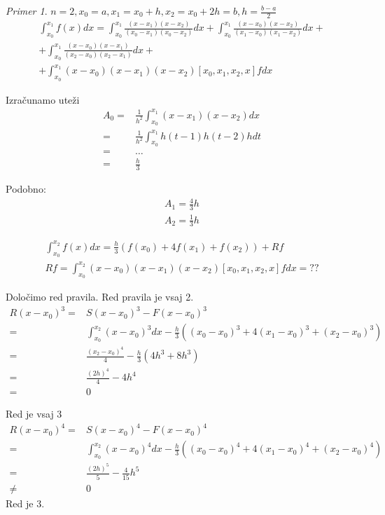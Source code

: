 \documentclass[a4paper,12pt]{article}
\theoremstyle{definition}
\theoremstyle{remark}
\newtheorem*{ex}{Primer}
\begin{document}
\begin{ex}
    $n = 2, x_0 = a, x_1 = x_0 + h, x_2 = x_0 + 2h = b, h = \frac{b-a}{2}$
    \begin{multline*}
        \int_{x_0}^{x_1} f(x) dx = \int_{x_0}^{x_1} \frac{(x-x_1)(x-x_2)}{(x_0-x_1)(x_0-x_2)} dx + \int_{x_0}^{x_1} \frac{(x-x_0)(x-x_2)}{(x_1-x_0)(x_1-x_2)} dx + \\
        + \int_{x_0}^{x_1} \frac{(x-x_0)(x-x_1)}{(x_2-x_0)(x_2-x_1)} dx + \\
        + \int_{x_0}^{x_1} (x-x_0)(x-x_1)(x-x_2) [x_0, x_1, x_2, x] f dx
    \end{multline*}
    
    Izračunamo uteži
    \begin{align*}
        A_0 =& \frac{1}{h^2} \int_{x_0}^{x_1} (x-x_1)(x-x_2) dx \\
            =& \frac{1}{h^2} \int_{x_0}^{x_1} h(t-1) h(t-2) h dt \\
            =& \dots \\
            =& \frac{h}{3}
    \end{align*}

    Podobno:
    \begin{align*}
        A_1 = \frac{4}{3}h\\
        A_2 = \frac{1}{3} h
    \end{align*}


    \begin{gather*}
        \int_{x_0}^{x_2} f(x) dx = \frac{h}{3} (f(x_0) + 4f(x_1) + f(x_2)) + Rf \\
        Rf = \int_{x_0}^{x_2} (x-x_0)(x-x_1)(x-x_2)[x_0, x_1, x_2, x] f dx = ??
    \end{gather*}

    Določimo red pravila.
    Red pravila je vsaj 2.
    \begin{align*}
        R(x-x_0)^3 =& S(x-x_0)^3 - F(x-x_0)^3 \\
                   =& \int_{x_0}^{x_2} (x-x_0)^3 dx - \frac{h}{3} ((x_0-x_0)^3 + 4(x_1-x_0)^3 + (x_2 - x_0)^3) \\
                   =& \frac{(x_2-x_0)^4}{4} - \frac{h}{3}(4h^3 + 8h^3) \\
                   =& \frac{(2h)^4}{4} - 4h^4 \\
                   =& 0
    \end{align*}
    
    Red je vsaj 3
    \begin{align*}
        R(x-x_0)^4 =& S(x-x_0)^4 - F(x-x_0)^4 \\
                   =& \int_{x_0}^{x_2} (x-x_0)^4 dx - \frac{h}{3} ((x_0-x_0)^4 + 4(x_1-x_0)^4 + (x_2 - x_0)^4) \\
                   =& \frac{(2h)^5}{5} - \frac{4}{15}h^5 \\
                   \neq& 0
    \end{align*}
    Red je 3.


\end{ex}
\end{document}
